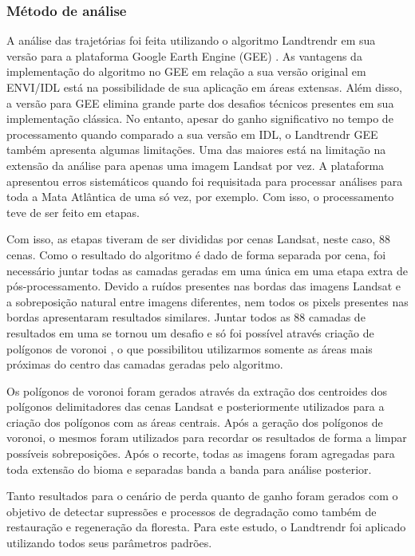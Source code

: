 \documentclass[12pt,a4paper]{article}
\begin{document}
\subsubsection{Método de análise}
A análise das trajetórias foi feita utilizando o algoritmo Landtrendr em sua versão para a plataforma Google Earth Engine (GEE) \citep{Kennedy2018}. As vantagens da implementação do algoritmo no GEE em relação a sua versão original em ENVI/IDL está na possibilidade de sua aplicação em áreas extensas. Além disso, a versão para GEE elimina grande parte dos desafios técnicos presentes em sua implementação clássica. No entanto, apesar do ganho significativo no tempo de processamento quando comparado a sua versão em IDL, o Landtrendr GEE também apresenta algumas limitações. Uma das maiores está na limitação na extensão da análise para apenas uma imagem Landsat por vez. A plataforma apresentou erros sistemáticos quando foi requisitada para processar análises para toda a Mata Atlântica de uma só vez, por exemplo. Com isso, o processamento teve de ser feito em etapas. 

Com isso, as etapas tiveram de ser divididas por cenas Landsat, neste caso, 88 cenas. Como o resultado do algoritmo é dado de forma separada por cena, foi necessário juntar todas as camadas geradas em uma única em uma etapa extra de pós-processamento. Devido a ruídos presentes nas bordas das imagens Landsat e a sobreposição natural entre imagens diferentes, nem todos os pixels presentes nas bordas apresentaram resultados similares. Juntar todos as 88 camadas de resultados em uma se tornou um desafio e só foi possível através criação de polígonos de voronoi \citep{Okabe}, o que possibilitou utilizarmos somente as áreas mais próximas do centro das camadas geradas pelo algoritmo. 

Os polígonos de voronoi foram gerados através da extração dos centroides dos polígonos delimitadores das cenas Landsat e posteriormente utilizados para a criação dos polígonos com as áreas centrais. Após a geração dos polígonos de voronoi, o mesmos foram utilizados para recordar os resultados de forma a limpar possíveis sobreposições. Após o recorte, todas as imagens foram agregadas para toda extensão do bioma e separadas banda a banda para análise posterior.


Tanto resultados para o cenário de perda quanto de ganho foram gerados com o objetivo de detectar supressões e processos de degradação como também de restauração e regeneração da floresta. Para este estudo, o Landtrendr foi aplicado utilizando todos seus parâmetros padrões.
\end{document}
